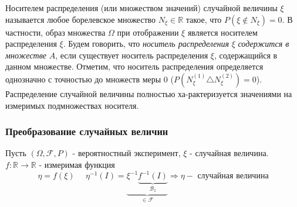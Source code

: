 \begin{definition}
	Носителем распределения (или множеством значений) случайной величины $\xi$ называется любое борелевское множество $N_{\xi} \in \mathbb{R}$ такое, что $P(\xi \notin N_{\xi}) = 0$. В частности, образ множества $\Omega$ при отображении $\xi$ является носителем распределения $\xi$. Будем говорить, что \textit{носитель распределения} $\xi$ \textit{содержится в множестве} $A$, если существует носитель распределения $\xi$, содержащийся в данном множестве. Отметим, что носитель распределения определяется однозначно с точностью до множеств меры 0 ($P(N_{\xi}^{(1)} \triangle N_{\xi}^{(2)}) = 0$). Распределение случайной величины полностью ха-рактеризуется значениями на измеримых подмножествах носителя.
\end{definition}

\subsubsection{Преобразование случайных величин}

\begin{figure}[H]
\end{figure}
Пусть $(\Omega, \mathcal{F}, P)$ - вероятностный эксперимент, $\xi$ - случайная величина.
\noindent $f: \mathbb{R} \to \mathbb{R}$ - измеримая функция
\[
\eta = f (\xi) ~~~~~~ \eta^{-1} (I) = \underbrace{\xi^{-1}\underbrace{f^{-1}(I)}_{\mathcal{B}_1}}_{\in \mathcal{F}} \Rightarrow \eta - \text{ случайная величина}
\]

